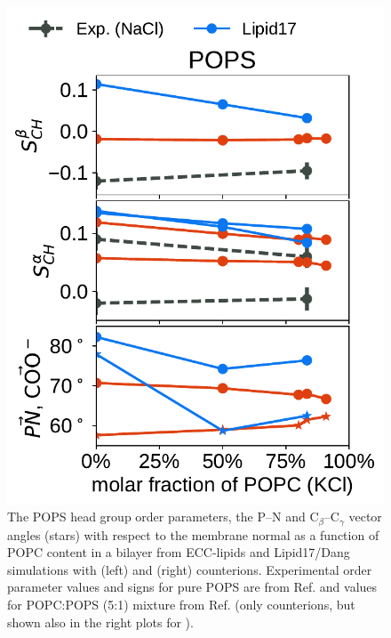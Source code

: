 \documentclass[journal=jpcbfk,manuscript=article]{achemso}
\newlength{\figheightsmall}
\newlength{\figheight}
\begin{document}
\begin{figure}[!tbp]
  \includegraphics[height=\figheightsmall]{../Fig/order_parameters_changes_A-B_PC-PS_mix_POPS_kcl.pdf} 
  \caption{\label{fig:delta_ordPar_NaCl_PC-PS_mix_PS} 
    The POPS head group order parameters, the P--N and C$_\beta$--C$_\gamma$ vector angles (stars)
    with respect to the membrane normal as a function of POPC content in a bilayer
    from ECC-lipids and Lipid17/Dang simulations with  (left) and  (right) counterions.
    Experimental order parameter values and signs for pure POPS are from Ref.  and values
    for POPC:POPS (5:1) mixture from Ref.  
    (only  counterions, but shown also in the right plots for ).
  }
\end{figure} 
\end{document}

